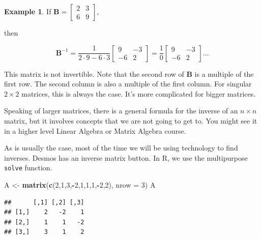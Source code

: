 \documentclass[
]{book}
\newenvironment{Shaded}{\begin{snugshade}}{\end{snugshade}}
\newcommand{\AttributeTok}[1]{\textcolor[rgb]{0.13,0.29,0.53}{#1}}
\newcommand{\DecValTok}[1]{\textcolor[rgb]{0.00,0.00,0.81}{#1}}
\newcommand{\FunctionTok}[1]{\textcolor[rgb]{0.13,0.29,0.53}{\textbf{#1}}}
\newcommand{\NormalTok}[1]{#1}
\newcommand{\OtherTok}[1]{\textcolor[rgb]{0.56,0.35,0.01}{#1}}
\newcommand{\SpecialCharTok}[1]{\textcolor[rgb]{0.81,0.36,0.00}{\textbf{#1}}}
\theoremstyle{definition}
\theoremstyle{definition}
\newtheorem{example}{Example}[chapter]
\theoremstyle{definition}
\theoremstyle{definition}
\theoremstyle{remark}
\begin{document}
\begin{examplebox}

\begin{example}
If \(\mathbf{B}=\displaystyle{\begin{bmatrix}
2 & 3\\6 & 9
\end{bmatrix}},\)

then

\[\mathbf{B}^{-1}=\frac{1}{2\cdot 9-6\cdot 3}\begin{bmatrix}
9 & -3 \\ -6 & 2
\end{bmatrix}=\frac{1}{0}\begin{bmatrix}
9 & -3 \\ -6 & 2
\end{bmatrix}\dots\]

This matrix is not invertible. Note that the second row of \(\mathbf{B}\) is a multiple of the first row. The second column is also a multiple of the first column. For singular \(2\times 2\) matrices, this is always the case. It's more complicated for bigger matrices.
\end{example}

\end{examplebox}

Speaking of larger matrices, there is a general formula for the inverse of an \(n\times n\) matrix, but it involves concepts that we are not going to get to. You might see it in a higher level Linear Algebra or Matrix Algebra course.

As is usually the case, most of the time we will be using technology to find inverses. Desmos has an inverse matrix button. In R, we use the multipurpose \texttt{solve} function.

\begin{Shaded}
\begin{Highlighting}[]
\NormalTok{A }\OtherTok{\textless{}{-}} \FunctionTok{matrix}\NormalTok{(}\FunctionTok{c}\NormalTok{(}\DecValTok{2}\NormalTok{,}\DecValTok{1}\NormalTok{,}\DecValTok{3}\NormalTok{,}\SpecialCharTok{{-}}\DecValTok{2}\NormalTok{,}\DecValTok{1}\NormalTok{,}\DecValTok{1}\NormalTok{,}\DecValTok{1}\NormalTok{,}\SpecialCharTok{{-}}\DecValTok{2}\NormalTok{,}\DecValTok{2}\NormalTok{), }\AttributeTok{nrow =} \DecValTok{3}\NormalTok{)}
\NormalTok{A}
\end{Highlighting}
\end{Shaded}

\begin{verbatim}
##      [,1] [,2] [,3]
## [1,]    2   -2    1
## [2,]    1    1   -2
## [3,]    3    1    2
\end{verbatim}
\end{document}

